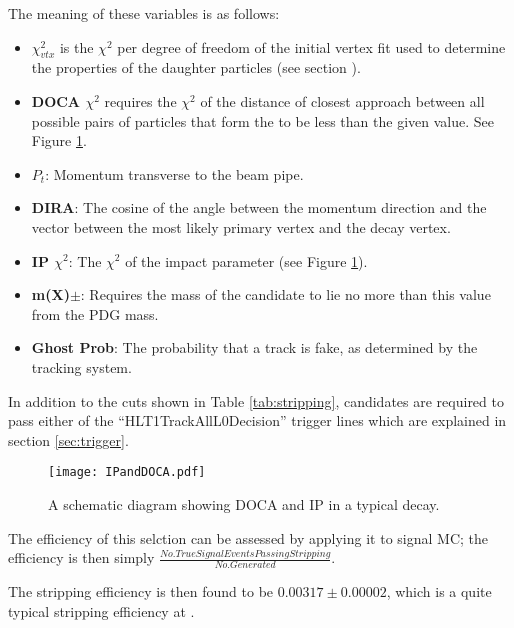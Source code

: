 The meaning of these variables is as follows:
\begin{itemize}
\item \textbf{$\chi_{vtx}^2$} is the $\chi^2$ per degree of freedom of the initial vertex fit used to determine the properties of the daughter particles (see section \label{sec:Decay Reconstruction}).
\item \textbf{DOCA $\chi^2$} requires the $\chi^2$ of the distance of closest approach between all possible pairs of particles that form the \Bd to be less than the given value. See Figure \ref{fig:DOCAandIP}.
\item \textbf{$P_t$}: Momentum transverse to the beam pipe.
\item \textbf{DIRA}: The cosine of the angle between the \Bd momentum direction and the vector between the most likely primary vertex and the \Bd decay vertex.
\item \textbf{IP $\chi^2$}: The $\chi^2$ of the impact parameter (see Figure \ref{fig:DOCAandIP}).
\item \textbf{m(X)$\pm$}: Requires the mass of the candidate to lie no more than this value from the PDG mass.
\item \textbf{Ghost Prob}: The probability that a track is fake, as determined by the \lhcb tracking system.
\end{itemize}
In addition to the cuts shown in Table \ref{tab:stripping}, candidates are required to pass either of the  ``HLT1TrackAllL0Decision'' trigger lines which are explained in section \ref{sec:trigger}.

\begin{figure}
  \texttt{[image: IPandDOCA.pdf]}
  \caption{A schematic diagram showing DOCA and IP in a typical \Bd decay.}
  \label{fig:DOCAandIP}
\end{figure}
The efficiency of this selction can be assessed by applying it to signal MC; the efficiency is then simply $\frac{No. True Signal Events Passing Stripping}{ No. Generated}$.

The stripping efficiency is then found to be $0.00317 \pm 0.00002$, which is a quite typical stripping efficiency at \lhcb.

